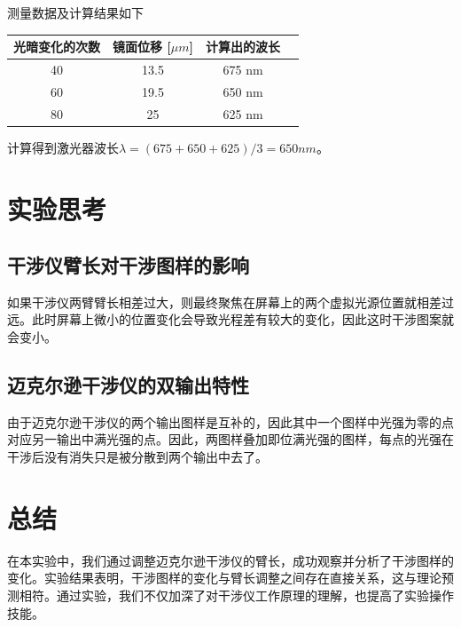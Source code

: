 \documentclass{ctexart}
\begin{document}
测量数据及计算结果如下
\begin{table}[H]
    \centering
    \begin{tabular}{|c|c|c|c|}
        \hline
        \rowcolor{yellow!25} 光暗变化的次数 & 镜面位移 [\(\mu m\)] & 计算出的波长 \\
        \hline
        40 & 13.5 & 675 nm  \\
        \hline
        60 & 19.5 & 650 nm  \\
        \hline
        80 & 25 & 625 nm  \\
        \hline
    \end{tabular}
\end{table}

计算得到激光器波长$\lambda=(675+650+625)/3=650 nm$。
\section{实验思考}
\subsection{干涉仪臂长对干涉图样的影响}
如果干涉仪两臂臂长相差过大，则最终聚焦在屏幕上的两个虚拟光源位置就相差过远。此时屏幕上微小的位置变化会导致光程差有较大的变化，因此这时干涉图案就会变小。

\subsection{迈克尔逊干涉仪的双输出特性}
由于迈克尔逊干涉仪的两个输出图样是互补的，因此其中一个图样中光强为零的点对应另一输出中满光强的点。因此，两图样叠加即位满光强的图样，每点的光强在干涉后没有消失只是被分散到两个输出中去了。
\section{总结}
在本实验中，我们通过调整迈克尔逊干涉仪的臂长，成功观察并分析了干涉图样的变化。实验结果表明，干涉图样的变化与臂长调整之间存在直接关系，这与理论预测相符。通过实验，我们不仅加深了对干涉仪工作原理的理解，也提高了实验操作技能。
\end{document}
